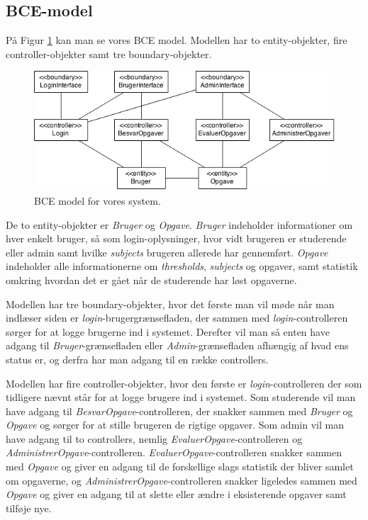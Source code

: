 \documentclass[11pt, a4paper]{article}
\begin{document}
\subsection{BCE-model}
På Figur \ref{fig:bce_model} kan man se vores BCE model. Modellen har to entity-objekter, fire controller-objekter samt tre boundary-objekter.

\begin{figure}[h]
  \centering
  \includegraphics[width=1\linewidth]{figures/BCE-Model.png}
  \caption{BCE model for vores system.}
  \label{fig:bce_model}
\end{figure}

De to entity-objekter er \emph{Bruger} og \emph{Opgave}. \emph{Bruger} indeholder informationer om hver enkelt bruger, så som login-oplysninger, hvor vidt brugeren er studerende eller admin samt hvilke \emph{subjects} brugeren allerede har gennemført. \emph{Opgave} indeholder alle informationerne om \emph{thresholds}, \emph{subjects} og opgaver, samt statistik omkring hvordan det er gået når de studerende har løst opgaverne.

Modellen har tre boundary-objekter, hvor det første man vil møde når man indlæser siden er \textit{login}-brugergrænsefladen, der sammen med \emph{login}-controlleren sørger for at logge brugerne ind i systemet. Derefter vil man så enten have adgang til \emph{Bruger}-grænsefladen eller \emph{Admin}-grænsefladen afhængig af hvad ens status er, og derfra har man adgang til en række controllers.

Modellen har fire controller-objekter, hvor den første er \emph{login}-controlleren der som tidligere nævnt står for at logge brugere ind i systemet. Som studerende vil man have adgang til \emph{BesvarOpgave}-controlleren, der snakker sammen med \emph{Bruger} og \emph{Opgave} og sørger for at stille brugeren de rigtige opgaver. Som admin vil man have adgang til to controllers, nemlig \emph{EvaluerOpgave}-controlleren og \emph{AdministrerOpgave}-controlleren. \emph{EvaluerOpgave}-controlleren snakker sammen med \emph{Opgave} og giver en adgang til de forskellige slags statistik der bliver samlet om opgaverne, og \emph{AdministrerOpgave}-controlleren snakker ligeledes sammen med \emph{Opgave} og giver en adgang til at slette eller ændre i eksisterende opgaver samt tilføje nye.
\FloatBarrier
\end{document}
